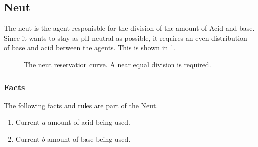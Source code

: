 \clearpage
\subsection{Neut}
The neut is the agent responisble for the division of the amount of Acid and base. Since it wants to stay as pH neutral as possible, it requires an even distribution of base and acid between the agents. This is shown in \cref{fig:neutreservationcurve}.
\begin{figure}
	\centering
		\caption{The neut reservation curve. A near equal division is required.}
		\label{fig:neutreservationcurve}
\end{figure}
\subsubsection{Facts}
The following facts and rules are part of the Neut.

\begin{enumerate}
	\item
	Current $a$ amount of acid being used.
	\item
	Current $b$ amount of base being used.
	
\end{enumerate}


%


